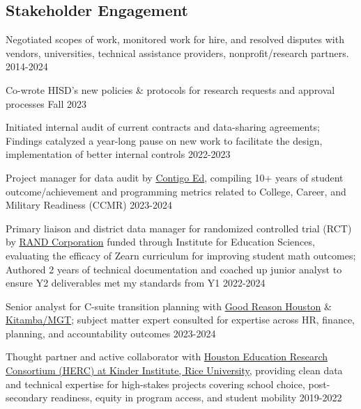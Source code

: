 \documentclass[
  11pt,
]
{article}
\renewenvironment{itemize}{
  \begin{list}{}{
    \setlength{\leftmargin}{1.5em}
  }
}{
  \end{list}
}
\begin{document}
\subsection{\texorpdfstring{\textbf{Stakeholder Engagement
}}{Stakeholder Engagement }}\label{stakeholder-engagement}

\begin{itemize}
\item
  Negotiated scopes of work, monitored work for hire, and resolved
  disputes with vendors, universities, technical assistance providers,
  nonprofit/research partners. \hfill 2014-2024
\item
  Co-wrote HISD's new policies \& protocols for research requests and
  approval processes \hfill Fall 2023
\item
  Initiated internal audit of current contracts and data-sharing
  agreements; Findings catalyzed a year-long pause on new work to
  facilitate the design, implementation of better internal controls
  \hfill 2022-2023
\item
  Project manager for data audit by
  \href{https://contigoed.org/our-work}{Contigo Ed}, compiling 10+ years
  of student outcome/achievement and programming metrics related to
  College, Career, and Military Readiness (CCMR) \hfill 2023-2024
\item
  Primary liaison and district data manager for randomized controlled
  trial (RCT) by \href{https://doi.org/10.26300/e3bq-7g59}{RAND
  Corporation} funded through Institute for Education Sciences,
  evaluating the efficacy of Zearn curriculum for improving student math
  outcomes; Authored 2 years of technical documentation and coached up
  junior analyst to ensure Y2 deliverables met my standards from Y1
  \hfill 2022-2024
\item
  Senior analyst for C-suite transition planning with
  \href{https://goodreasonhouston.org/about-us/}{Good Reason Houston} \&
  \href{https://www.linkedin.com/company/kitamba-management-inc}{Kitamba/MGT};
  subject matter expert consulted for expertise across HR, finance,
  planning, and accountability outcomes \hfill 2023-2024
\item
  Thought partner and active collaborator with
  \href{https://kinder.rice.edu/centers/houston-education-research-consortium}{Houston
  Education Research Consortium (HERC) at Kinder Institute, Rice
  University}, providing clean data and technical expertise for
  high-stakes projects covering school choice, post-secondary readiness,
  equity in program access, and student mobility \hfill 2019-2022
\end{itemize}
\end{document}
